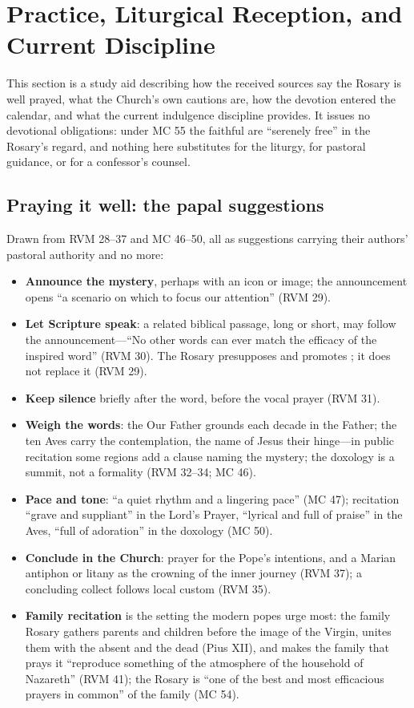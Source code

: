 \section{Practice, Liturgical Reception, and Current Discipline}
\label{sec:practice}

This section is a study aid describing how the received sources say the
Rosary is well prayed, what the Church's own cautions are, how the
devotion entered the calendar, and what the current indulgence
discipline provides. It issues no devotional obligations: under MC 55
the faithful are ``serenely free'' in the Rosary's regard, and nothing
here substitutes for the liturgy, for pastoral guidance, or for a
confessor's counsel.

\subsection{Praying it well: the papal suggestions}

Drawn from RVM 28--37 and MC 46--50, all as suggestions carrying their
authors' pastoral authority and no more:

\begin{itemize}
\item \textbf{Announce the mystery}, perhaps with an icon or image; the
announcement opens ``a scenario on which to focus our attention'' (RVM
29).
\item \textbf{Let Scripture speak}: a related biblical passage, long or
short, may follow the announcement---``No other words can ever match
the efficacy of the inspired word'' (RVM 30). The Rosary presupposes
and promotes ; it does not replace it (RVM 29).
\item \textbf{Keep silence} briefly after the word, before the vocal
prayer (RVM 31).
\item \textbf{Weigh the words}: the Our Father grounds each decade in
the Father; the ten Aves carry the contemplation, the name of Jesus
their hinge---in public recitation some regions add a clause naming the
mystery; the doxology is a summit, not a formality (RVM 32--34; MC
46).
\item \textbf{Pace and tone}: ``a quiet rhythm and a lingering pace''
(MC 47); recitation ``grave and suppliant'' in the Lord's Prayer,
``lyrical and full of praise'' in the Aves, ``full of adoration'' in
the doxology (MC 50).
\item \textbf{Conclude in the Church}: prayer for the Pope's
intentions, and a Marian antiphon or litany as the crowning of the
inner journey (RVM 37); a concluding collect follows local custom (RVM
35).
\item \textbf{Family recitation} is the setting the modern popes urge
most: the family Rosary gathers parents and children before the image
of the Virgin, unites them with the absent and the dead (Pius XII),
and makes the family that prays it ``reproduce something of the
atmosphere of the household of Nazareth'' (RVM 41); the Rosary is
``one of the best and most efficacious prayers in common'' of the
family (MC 54).
\end{itemize}


